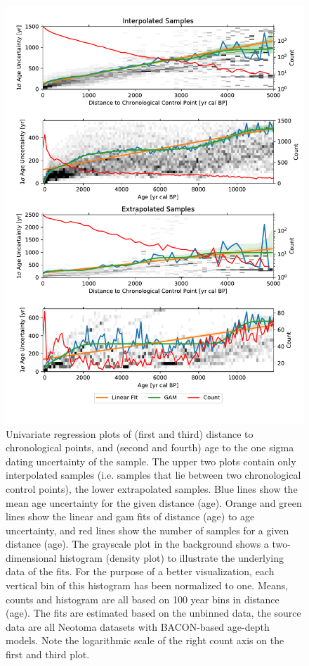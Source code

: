 \documentclass[
11pt, %
english, %
singlespacing, %
headsepline, %
]{MastersDoctoralThesis} %
\begin{document}
\begin{NoHyper}
\begin{refsection}
\begin{figure}
	\captionsetup{width=\linewidth}
	\includegraphics[width=\linewidth]{gridding-figures/univariate-models.pdf}
	\caption[Univariate age uncertainty models]{Univariate regression plots of (first and third) distance to chronological points, and (second and fourth) age to the one sigma dating uncertainty of the sample. The upper two plots contain only interpolated samples (i.e. samples that lie between two chronological control points), the lower extrapolated samples. Blue lines show the mean age uncertainty for the given distance (age). Orange and green lines show the linear and \gls{gam} fits of distance (age) to age uncertainty, and red lines show the number of samples for a given distance (age). The grayscale plot in the background shows a two-dimensional histogram (density plot) to illustrate the underlying data of the fits. For the purpose of a better visualization, each vertical bin of this histogram has been normalized to one. Means, counts and histogram are all based on 100 year bins in distance (age). The fits are estimated based on the unbinned data, the source data are all Neotoma datasets with BACON-based age-depth models. Note the logarithmic scale of the right count axis on the first and third plot.}
	\label{fig:gridding-univariate-age-unc}
\end{figure}


\end{refsection}
\end{NoHyper}
\end{document}
